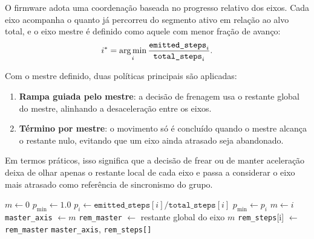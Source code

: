 O firmware adota uma coordena\c{c}\~ao baseada no progresso relativo dos
eixos. Cada eixo acompanha o quanto j\'a percorreu do segmento ativo em
rela\c{c}\~ao ao alvo total, e o eixo mestre \'e definido como aquele com
menor fra\c{c}\~ao de avan\c{c}o:
\begin{equation}
    i^\ast = \operatorname*{arg\,min}_i \frac{\texttt{emitted\_steps}_i}{\texttt{total\_steps}_i}.
\end{equation}

Com o mestre definido, duas pol\'iticas principais s\~ao aplicadas:
\begin{enumerate}
\item \textbf{Rampa guiada pelo mestre}: a decis\~ao de frenagem usa o
  restante global do mestre, alinhando a desacelera\c{c}\~ao entre os
  eixos.
\item \textbf{T\'ermino por mestre}: o movimento s\'o \'e conclu\'ido
  quando o mestre alcan\c{c}a o restante nulo, evitando que um eixo ainda
  atrasado seja abandonado.
\end{enumerate}

\noindent Em termos pr\'aticos, isso significa que a decis\~ao de frear
ou de manter acelera\c{c}\~ao deixa de olhar apenas o restante local de
cada eixo e passa a considerar o eixo mais atrasado como refer\^encia de
sincronismo do grupo.

\begin{algorithm}[H]
    \caption{Sele\c{c}\~ao do eixo mestre e coordena\c{c}\~ao de remanescentes.}
    \label{alg:eixo-mestre}
    \begin{algorithmic}[1]
            \State $m \gets 0$
            \State $p_{\min} \gets 1.0$
                    \State $p_i \gets \texttt{emitted\_steps}[i] / \texttt{total\_steps}[i]$
                        \State $p_{\min} \gets p_i$
                        \State $m \gets i$
                    \EndIf
                \EndIf
            \EndFor
            \State \texttt{master\_axis} $\gets m$
            \State \texttt{rem\_master} $\gets$ restante global do eixo $m$
                \State \texttt{rem\_steps}[i] $\gets$ \texttt{rem\_master}
            \EndFor
            \State \Return \texttt{master\_axis}, \texttt{rem\_steps[]}
        \EndProcedure
    \end{algorithmic}
\end{algorithm}

